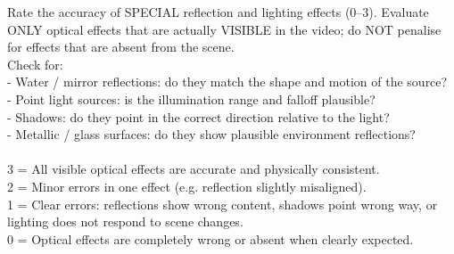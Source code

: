 \begin{tcolorbox}[d5box, title={Track 2 Rubric --- Reflection \& Lighting}]
\ttfamily\scriptsize
Rate the accuracy of SPECIAL reflection and lighting effects (0--3). Evaluate ONLY optical effects that are actually VISIBLE in the video; do NOT penalise for effects that are absent from the scene.\\
Check for:\\
- Water / mirror reflections: do they match the shape and motion of the source?\\
- Point light sources: is the illumination range and falloff plausible?\\
- Shadows: do they point in the correct direction relative to the light?\\
- Metallic / glass surfaces: do they show plausible environment reflections?\\
\\
3 = All visible optical effects are accurate and physically consistent.\\
2 = Minor errors in one effect (e.g. reflection slightly misaligned).\\
1 = Clear errors: reflections show wrong content, shadows point wrong way, or lighting does not respond to scene changes.\\
0 = Optical effects are completely wrong or absent when clearly expected.
\end{tcolorbox}

\vspace{4pt}

